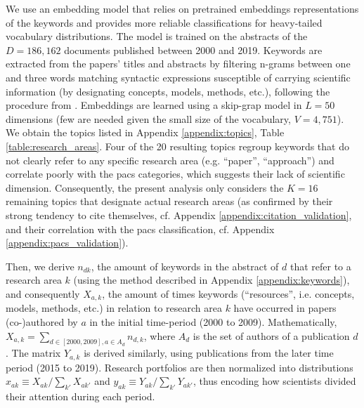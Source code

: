 \documentclass{article}
\begin{document}
We use an embedding model \citealt{Dieng2020} that relies on pretrained embeddings representations of the keywords and provides more reliable classifications for heavy-tailed vocabulary distributions. %
The model is trained on the abstracts of the $D=186,162$ documents published between 2000 and 2019. Keywords are extracted from the papers' titles and abstracts by filtering n-grams between one and three words matching syntactic expressions susceptible of carrying scientific information (by designating concepts, models, methods, etc.), following the procedure from \citealt{Gautheron2023,omodei_tel-01097702}. Embeddings are learned using a skip-grap model in $L=50$ dimensions (few are needed given the small size of the vocabulary, $V=4,751$). We obtain the topics listed in Appendix \ref{appendix:topics}, Table \ref{table:research_areas}. %
Four of the 20 resulting topics regroup keywords that do not clearly refer to any specific research area (e.g. ``paper'', ``approach'') and correlate poorly with the \gls{pacs} categories, which suggests their lack of scientific dimension. Consequently, the present analysis only considers the $K=16$ remaining topics that designate actual research areas (as confirmed by their strong tendency to cite themselves, cf. Appendix \ref{appendix:citation_validation}, and their correlation with the \gls{pacs} classification, cf. Appendix \ref{appendix:pacs_validation}).


Then, we derive $n_{dk}$, the amount of keywords in the abstract of $d$ that refer to a research area $k$ (using the method described in Appendix \ref{appendix:keywords}), and consequently $X_{a,k}$, the amount of times keywords (``resources'', i.e. concepts, models, methods, etc.) in relation to research area $k$ have occurred in papers (co-)authored by $a$ in the initial time-period (2000 to 2009). Mathematically, $X_{a,k}=\sum_{d\in [2000,2009],a\in A_d} n_{d,k}$, where $A_d$ is the set of authors of a publication $d$. The matrix $Y_{a,k}$ is derived similarly, using publications from the later time period (2015 to 2019). Research portfolios are then normalized into distributions $x_{ak} \equiv X_{ak}/\sum_{k'} X_{ak'}$ and $y_{ak} \equiv Y_{ak}/\sum_{k'} Y_{ak'}$, thus encoding how scientists divided their attention during each period.
\end{document}
